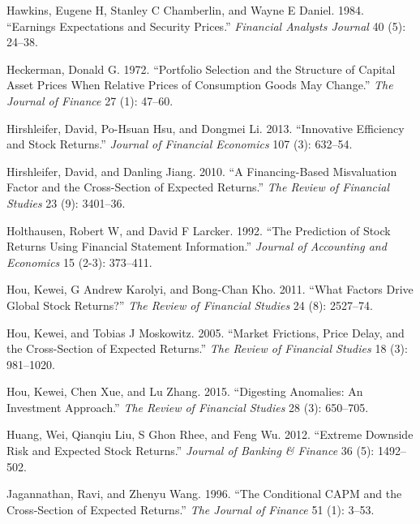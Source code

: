 \documentclass[
  letterpaper,
  DIV=11,
  numbers=noendperiod]{scrreprt}
\newlength{\cslhangindent}
\newlength{\cslentryspacingunit} %
\newenvironment{CSLReferences}[2] %
 {%
  \setlength{\parindent}{0pt}
  \ifodd #1
  \let\oldpar\par
  \def\par{\hangindent=\cslhangindent\oldpar}
  \fi
  \setlength{\parskip}{#2\cslentryspacingunit}
 }%
 {}
\begin{document}
\begin{CSLReferences}{1}{0}
\leavevmode{}%
Hawkins, Eugene H, Stanley C Chamberlin, and Wayne E Daniel. 1984.
{``Earnings Expectations and Security Prices.''} \emph{Financial
Analysts Journal} 40 (5): 24--38.

\leavevmode{}%
Heckerman, Donald G. 1972. {``Portfolio Selection and the Structure of
Capital Asset Prices When Relative Prices of Consumption Goods May
Change.''} \emph{The Journal of Finance} 27 (1): 47--60.

\leavevmode{}%
Hirshleifer, David, Po-Hsuan Hsu, and Dongmei Li. 2013. {``Innovative
Efficiency and Stock Returns.''} \emph{Journal of Financial Economics}
107 (3): 632--54.

\leavevmode{}%
Hirshleifer, David, and Danling Jiang. 2010. {``A Financing-Based
Misvaluation Factor and the Cross-Section of Expected Returns.''}
\emph{The Review of Financial Studies} 23 (9): 3401--36.

\leavevmode{}%
Holthausen, Robert W, and David F Larcker. 1992. {``The Prediction of
Stock Returns Using Financial Statement Information.''} \emph{Journal of
Accounting and Economics} 15 (2-3): 373--411.

\leavevmode{}%
Hou, Kewei, G Andrew Karolyi, and Bong-Chan Kho. 2011. {``What Factors
Drive Global Stock Returns?''} \emph{The Review of Financial Studies} 24
(8): 2527--74.

\leavevmode{}%
Hou, Kewei, and Tobias J Moskowitz. 2005. {``Market Frictions, Price
Delay, and the Cross-Section of Expected Returns.''} \emph{The Review of
Financial Studies} 18 (3): 981--1020.

\leavevmode{}%
Hou, Kewei, Chen Xue, and Lu Zhang. 2015. {``Digesting Anomalies: An
Investment Approach.''} \emph{The Review of Financial Studies} 28 (3):
650--705.

\leavevmode{}%
Huang, Wei, Qianqiu Liu, S Ghon Rhee, and Feng Wu. 2012. {``Extreme
Downside Risk and Expected Stock Returns.''} \emph{Journal of Banking \&
Finance} 36 (5): 1492--502.

\leavevmode{}%
Jagannathan, Ravi, and Zhenyu Wang. 1996. {``The Conditional CAPM and
the Cross-Section of Expected Returns.''} \emph{The Journal of Finance}
51 (1): 3--53.


\end{CSLReferences}
\end{document}
